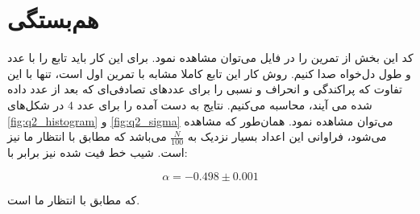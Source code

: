 \documentclass[11pt, a4paper]{article}
\begin{document}
\section{\textbf{هم‌بستگی}}
کد این بخش از تمرین را در فایل
می‌توان مشاهده نمود.
برای این کار باید تابع
را با عدد‌ و طول دل‌خواه صدا کنیم.
روش کار این تابع کاملا مشابه با تمرین اول است،
تنها با این تفاوت که پراکندگی و انحراف و نسبی را برای عدد‌های تصادفی‌ای که بعد از عدد داده شده می آیند،
محاسبه می‌کنیم.
نتایج به دست آمده را برای عدد
$4$
در شکل‌های
\ref{fig:q2_histogram}
و
\ref{fig:q2_sigma}
می‌توان مشاهده نمود.
همان‌طور که مشاهده می‌شود، فراوانی این اعداد بسیار نزدیک به
$\frac{N}{100}$
می‌باشد که مطابق با انتظار ما نیز است.
شیب خط فیت شده نیز برابر با:

\begin{equation}
  \alpha = -0.498 \pm 0.001
\end{equation}

که مطابق با انتظار ما است.
\end{document}
